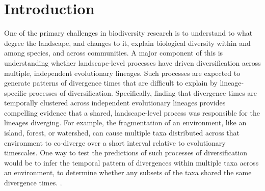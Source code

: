 \section{Introduction}

One of the primary challenges in biodiversity research is to understand to what
degree the landscape, and changes to it, explain biological diversity within
and among species, and across communities.
A major component of this is understanding whether landscape-level processes
have driven diversification across multiple, independent evolutionary lineages.
Such processes are expected to generate patterns of divergence times that are
difficult to explain by lineage-specific processes of diversification.
Specifically, finding that divergence times are temporally clustered across
independent evolutionary lineages provides compelling evidence that a shared,
landscape-level process was responsible for the lineages diverging.
For example, the fragmentation of an environment, like an island, forest, or
watershed, can cause multiple taxa distributed across that environment to
co-diverge over a short interval relative to evolutionary timescales.
One way to test the predictions of such processes of diversification would be
to infer the temporal pattern of divergences within multiple taxa across an
environment, to determine whether any subsets of the taxa shared the same
divergence times.
.

